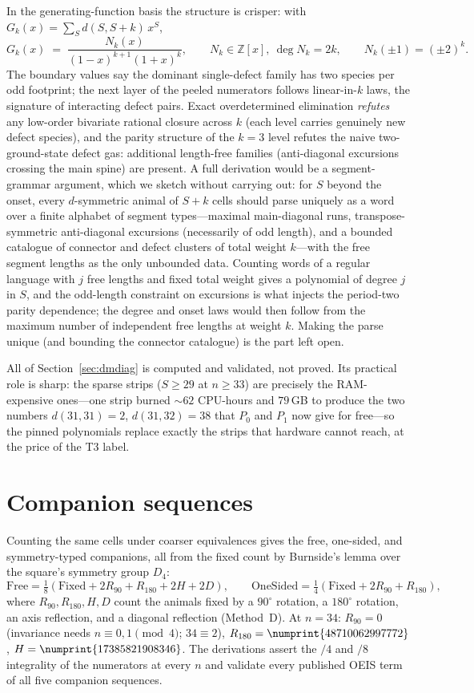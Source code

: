 \documentclass[11pt]{article}
\newcommand{\num}[1]{\numprint{#1}}
\newcommand{\tierthree}{\textsf{T3}}
\begin{document}
In the generating-function basis the structure is crisper: with
$G_k(x)=\sum_S d(S,S+k)\,x^S$,
\[
  G_k(x)\;=\;\frac{N_k(x)}{(1-x)^{k+1}(1+x)^{k}},\qquad
  N_k \in \mathbb{Z}[x],\ \deg N_k = 2k,\qquad
  N_k(\pm1)=(\pm2)^k .
\]
The boundary values say the dominant single-defect family has two species per
odd footprint; the next layer of the peeled numerators follows linear-in-$k$
laws, the signature of interacting defect pairs. Exact overdetermined
elimination \emph{refutes} any low-order bivariate rational closure across
$k$ (each level carries genuinely new defect species), and the parity
structure of the $k=3$ level refutes the naive two-ground-state defect gas:
additional length-free families (anti-diagonal excursions crossing the main
spine) are present. A full derivation would be a segment-grammar argument,
which we sketch without carrying out: for $S$ beyond the onset, every
$d$-symmetric animal of $S+k$ cells should parse uniquely as a word over a
finite alphabet of segment types---maximal main-diagonal runs, transpose-
symmetric anti-diagonal excursions (necessarily of odd length), and a
bounded catalogue of connector and defect clusters of total weight
$k$---with the free segment lengths as the only unbounded data. Counting
words of a regular language with $j$ free lengths and fixed total weight
gives a polynomial of degree $j$ in $S$, and the odd-length constraint on
excursions is what injects the period-two parity dependence; the degree and
onset laws would then follow from the maximum number of independent free
lengths at weight $k$. Making the parse unique (and bounding the connector
catalogue) is the part left open.

All of Section~\ref{sec:dmdiag} is computed and validated, not proved. Its
practical role is sharp: the sparse strips ($S\ge29$ at $n\ge33$) are
precisely the RAM-expensive ones---one strip burned $\sim$$62$ CPU-hours and
$79$\,GB to produce the two numbers $d(31,31)=2$, $d(31,32)=38$ that $P_0$
and $P_1$ now give for free---so the pinned polynomials replace exactly the
strips that hardware cannot reach, at the price of the \tierthree{} label.

\section{Companion sequences}
\label{sec:companions}

Counting the same cells under coarser equivalences gives the free, one-sided,
and symmetry-typed companions, all from the fixed count by Burnside's lemma
over the square's symmetry group $D_4$:
\[
  \mathrm{Free}=\tfrac18(\mathrm{Fixed}+2R_{90}+R_{180}+2H+2D),\qquad
  \mathrm{OneSided}=\tfrac14(\mathrm{Fixed}+2R_{90}+R_{180}),
\]
where $R_{90},R_{180},H,D$ count the animals fixed by a $90^\circ$ rotation,
a $180^\circ$ rotation, an axis reflection, and a diagonal reflection
(Method~D). At $n=34$: $R_{90}=0$ (invariance needs $n\equiv0,1\pmod4$;
$34\equiv2$), $R_{180}=\num{48710062997772}$, $H=\num{17385821908346}$. The
derivations assert the $/4$ and $/8$ integrality of the numerators at every
$n$ and validate every published OEIS term of all five companion sequences.
\end{document}
